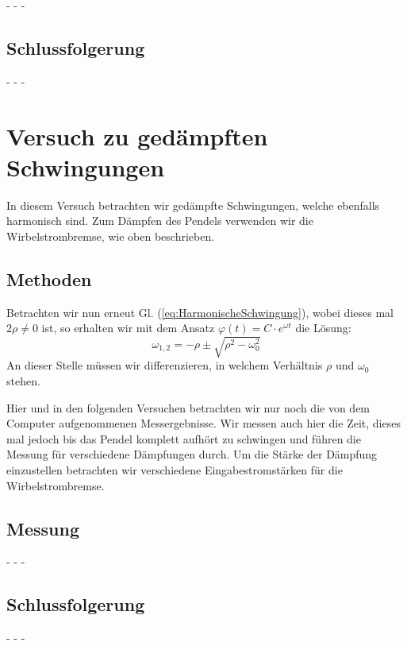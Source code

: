 \documentclass[11pt,a4paper,titlepage, ngerman]{article}
\newcommand{\refeq}[1]{Gl. (\ref{eq:#1})}
\begin{document}
			- - -
			
		\subsection*{Schlussfolgerung}
			
			- - -
				
	\section{Versuch zu gedämpften Schwingungen}
		
		In diesem Versuch betrachten wir gedämpfte Schwingungen, welche ebenfalls harmonisch sind.
		Zum Dämpfen des Pendels verwenden wir die Wirbelstrombremse, wie oben beschrieben. 
				
		\subsection*{Methoden}
			
			Betrachten wir nun erneut \refeq{HarmonischeSchwingung}, wobei dieses mal $2\rho \neq 0$ ist, so
			erhalten wir mit dem Ansatz $\varphi (t)=C\cdot e^{\omega t}$ die Lösung: 
			\begin{equation}
				\omega_{1,2}= -\rho \pm \sqrt{\rho^2-\omega_0^2}
			\end{equation}
			An dieser Stelle müssen wir differenzieren, in welchem Verhältnis $\rho$ und $\omega_0$ stehen.
						
			Hier und in den folgenden Versuchen betrachten wir nur noch die von dem Computer aufgenommenen Messergebnisse. Wir messen auch hier die Zeit, dieses mal jedoch bis das Pendel komplett aufhört zu schwingen und führen die Messung für verschiedene Dämpfungen durch. Um die Stärke der Dämpfung einzustellen betrachten wir verschiedene Eingabestromstärken für die Wirbelstrombremse.
		
		\subsection*{Messung}
		
			- - -
			
		\subsection*{Schlussfolgerung}
			
			- - -
			
\end{document}
